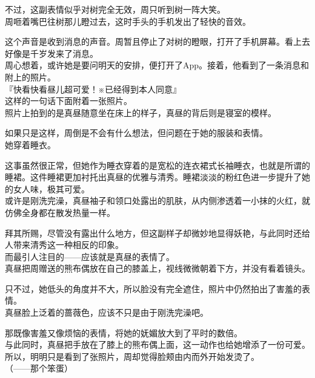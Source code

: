 不过，这副表情似乎对树完全无效，周只听到树一阵大笑。\\

周咂着嘴巴往树那儿瞪过去，这时手头的手机发出了轻快的音效。

这个声音是收到消息的声音。周暂且停止了对树的瞪眼，打开了手机屏幕。看上去好像是千岁发来了消息。\\

周心想着，或许她是要问明天的安排，便打开了App。接着，他看到了一条消息和附上的照片。\\

『快看快看昼儿超可爱！※已经得到本人同意』\\

这样的一句话下面附着一张照片。\\

照片上拍到的是真昼随意坐在床上的样子，真昼的背后则是寝室的模样。

如果只是这样，周倒是不会有什么想法，但问题在于她的服装和表情。\\

她穿着睡衣。

这事虽然很正常，但她作为睡衣穿着的是宽松的连衣裙式长袖睡衣，也就是所谓的睡裙。这件睡裙更加衬托出真昼的优雅与清秀。睡裙淡淡的粉红色进一步提升了她的女人味，极其可爱。\\

或许是刚洗完澡，真昼袖子和领口处露出的肌肤，从内侧渗透着一小抹的火红，就仿佛全身都在散发热量一样。

拜其所赐，尽管没有露出什么地方，但这副样子却微妙地显得妖艳，与此同时还给人带来清秀这一种相反的印象。\\

而最引人注目的——应该就是真昼的表情了。\\

真昼把周赠送的熊布偶放在自己的膝盖上，视线微微朝着下方，并没有看着镜头。

只不过，她低头的角度并不大，所以脸没有完全遮住，照片中仍然拍出了害羞的表情。\\

真昼脸上泛着的蔷薇色，应该不只是由于刚洗完澡吧。

那既像害羞又像烦恼的表情，将她的妩媚放大到了平时的数倍。\\

与此同时，真昼把手放在了膝上的熊布偶上面，这一动作也给她增添了一份可爱。所以，明明只是看到了张照片，周却觉得脸颊由内而外开始发烫了。\\

（——那个笨蛋）\\

